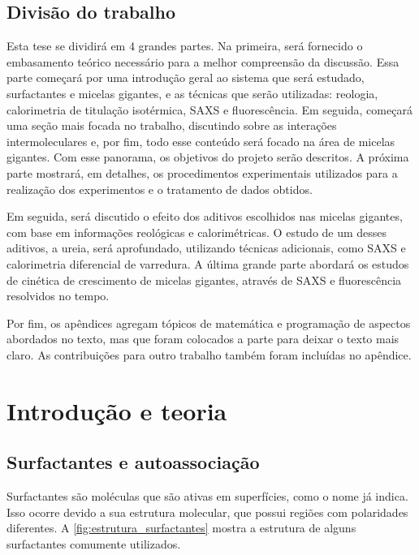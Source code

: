 
	\chapter*{Divisão do trabalho}
Esta tese se dividirá em 4 grandes partes. Na primeira, será fornecido o embasamento teórico necessário para a melhor compreensão da discussão. Essa parte começará por uma introdução geral ao sistema que será estudado, surfactantes e micelas gigantes, e as técnicas que serão utilizadas: reologia, calorimetria de titulação isotérmica, SAXS e fluorescência. Em seguida, começará uma seção mais focada no trabalho, discutindo sobre as interações intermoleculares e, por fim, todo esse conteúdo será focado na área de micelas gigantes. Com esse panorama, os objetivos do projeto serão descritos. A próxima parte mostrará, em detalhes, os procedimentos experimentais utilizados para a realização dos experimentos e o tratamento de dados obtidos.

Em seguida, será discutido o efeito dos aditivos escolhidos nas micelas gigantes, com base em informações reológicas e calorimétricas. O estudo de um desses aditivos, a ureia, será aprofundado, utilizando técnicas adicionais, como SAXS e calorimetria diferencial de varredura. A última grande parte abordará os estudos de cinética de crescimento de micelas gigantes, através de SAXS e fluorescência resolvidos no tempo.

Por fim, os apêndices agregam tópicos de matemática e programação de aspectos abordados no texto, mas que foram colocados a parte para deixar o texto mais claro. As contribuições para outro trabalho também foram incluídas no apêndice.

\part{Introdução e teoria}


	\chapter{Surfactantes e autoassociação}
	\label{sec:surfactantes_autoassociação}
	Surfactantes são moléculas que são ativas em superfícies, como o nome já indica.\cite{Lindman_livro} Isso ocorre devido a sua estrutura molecular, que possui regiões com polaridades diferentes. A \autoref{fig:estrutura_surfactantes} mostra a estrutura de alguns surfactantes comumente utilizados.
	
